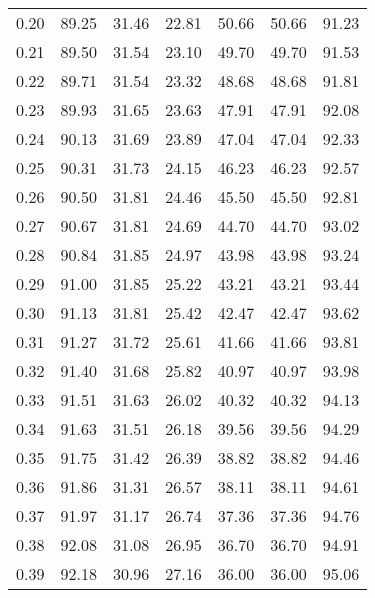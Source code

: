 \begin{tabular}{|c|c|c|c|c|c|c|}
      0.20 &     89.25 &     31.46 &      22.81 &   50.66 &      50.66 &         91.23 \\
      0.21 &     89.50 &     31.54 &      23.10 &   49.70 &      49.70 &         91.53 \\
      0.22 &     89.71 &     31.54 &      23.32 &   48.68 &      48.68 &         91.81 \\
      0.23 &     89.93 &     31.65 &      23.63 &   47.91 &      47.91 &         92.08 \\
      0.24 &     90.13 &     31.69 &      23.89 &   47.04 &      47.04 &         92.33 \\
      0.25 &     90.31 &     31.73 &      24.15 &   46.23 &      46.23 &         92.57 \\
      0.26 &     90.50 &     31.81 &      24.46 &   45.50 &      45.50 &         92.81 \\
      0.27 &     90.67 &     31.81 &      24.69 &   44.70 &      44.70 &         93.02 \\
      0.28 &     90.84 &     31.85 &      24.97 &   43.98 &      43.98 &         93.24 \\
      0.29 &     91.00 &     31.85 &      25.22 &   43.21 &      43.21 &         93.44 \\
      0.30 &     91.13 &     31.81 &      25.42 &   42.47 &      42.47 &         93.62 \\
      0.31 &     91.27 &     31.72 &      25.61 &   41.66 &      41.66 &         93.81 \\
      0.32 &     91.40 &     31.68 &      25.82 &   40.97 &      40.97 &         93.98 \\
      0.33 &     91.51 &     31.63 &      26.02 &   40.32 &      40.32 &         94.13 \\
      0.34 &     91.63 &     31.51 &      26.18 &   39.56 &      39.56 &         94.29 \\
      0.35 &     91.75 &     31.42 &      26.39 &   38.82 &      38.82 &         94.46 \\
      0.36 &     91.86 &     31.31 &      26.57 &   38.11 &      38.11 &         94.61 \\
      0.37 &     91.97 &     31.17 &      26.74 &   37.36 &      37.36 &         94.76 \\
      0.38 &     92.08 &     31.08 &      26.95 &   36.70 &      36.70 &         94.91 \\
      0.39 &     92.18 &     30.96 &      27.16 &   36.00 &      36.00 &         95.06 \\

\end{tabular}
